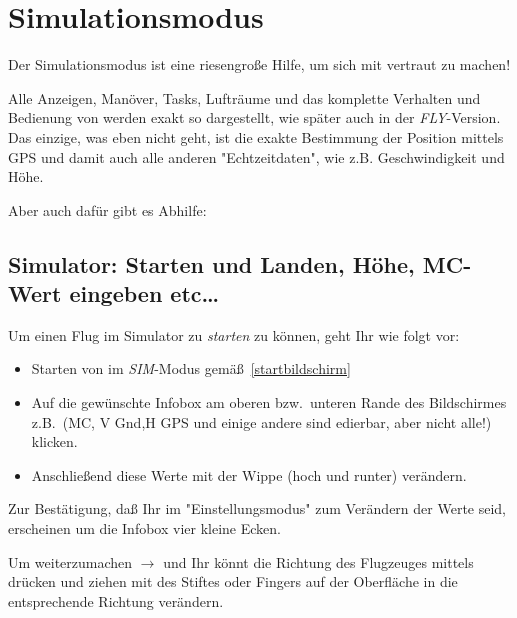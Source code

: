 \section{Simulationsmodus}\label{sim-mode}
Der Simulationsmodus ist eine riesengroße Hilfe, um sich mit \xc vertraut zu machen!

Alle Anzeigen, Manöver, Tasks, Lufträume und das komplette Verhalten und Bedienung von \xc werden exakt
so dargestellt, wie später auch in der \textsl{FLY}-Version. Das einzige, was eben nicht geht, ist die exakte Bestimmung der Position mittels GPS und damit auch alle anderen "Echtzeitdaten", wie z.B. Geschwindigkeit und Höhe.

Aber auch dafür gibt es Abhilfe:
\subsection{Simulator: Starten und Landen, Höhe, MC-Wert eingeben etc\dots }\label{SimStartenLanden}
Um einen Flug im Simulator zu \textit{starten} zu können, geht Ihr wie folgt vor:
\begin{itemize}
\item Starten von \xc im \textsl{SIM}-Modus gemäß~\ref{startbildschirm}
\item Auf die gewünschte Infobox  am oberen bzw.\ unteren Rande des Bildschirmes z.B.\ (\textsf{MC}, \textsf{V Gnd},\textsf{H  GPS} und einige andere sind edierbar, aber nicht alle!) klicken.
\item Anschließend diese Werte mit der Wippe (hoch und runter) verändern.
\end{itemize}
Zur Bestätigung, daß Ihr im "Einstellungsmodus" zum Verändern der Werte seid, erscheinen um die Infobox vier kleine Ecken.

Um weiterzumachen $\rightarrow$ \dklick und Ihr könnt die Richtung des Flugzeuges mittels drücken und ziehen mit des Stiftes oder Fingers auf der Oberfläche in die entsprechende Richtung verändern.

